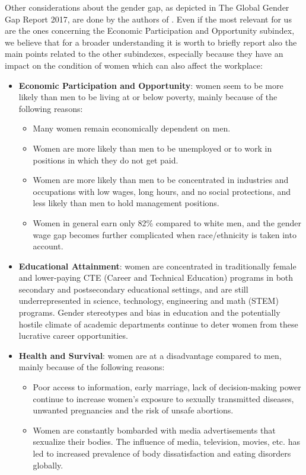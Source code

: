 Other considerations about the gender gap, as depicted in The Global Gender Gap Report 2017, are done by the authors of \cite{hazel2020gender}. Even if the most relevant for us are the ones concerning the Economic Participation and Opportunity subindex, we believe that for a broader understanding it is worth to briefly report also the main points related to the other subindexes, especially because they have an impact on the condition of women which can also affect the workplace:
\begin{itemize}
\item \textbf{Economic Participation and Opportunity}: women seem to be more likely than men to be living at or below poverty, mainly because of the following reasons:
\begin{itemize}
\item Many women remain economically dependent on men.
\item Women are more likely than men to be unemployed or to work in positions in which they do not get paid.
\item Women are more likely than men to be concentrated in industries and occupations with low wages, long hours, and no social protections, and less likely than men to hold management positions.
\item Women in general earn only 82\% compared to white men, and the gender wage gap becomes further complicated when race/ethnicity is taken into account.
\end{itemize}
\item \textbf{Educational Attainment}: women are concentrated in traditionally female and lower-paying CTE (Career and Technical Education) programs in both secondary and postsecondary educational settings, and are still underrepresented in science, technology, engineering and math (STEM) programs. Gender stereotypes and bias in education and the potentially hostile climate of academic departments continue to deter women from these lucrative career opportunities.
\item \textbf{Health and Survival}: women are at a disadvantage compared to men, mainly because of the following reasons:
\begin{itemize}
\item Poor access to information, early marriage, lack of decision-making power continue to increase women's exposure to sexually transmitted diseases, unwanted pregnancies and the risk of unsafe abortions.
\item Women are constantly bombarded with media advertisements that sexualize their bodies. The influence of media, television, movies, etc. has led to increased prevalence of body dissatisfaction and eating disorders globally.

\end{itemize}
\end{itemize}
